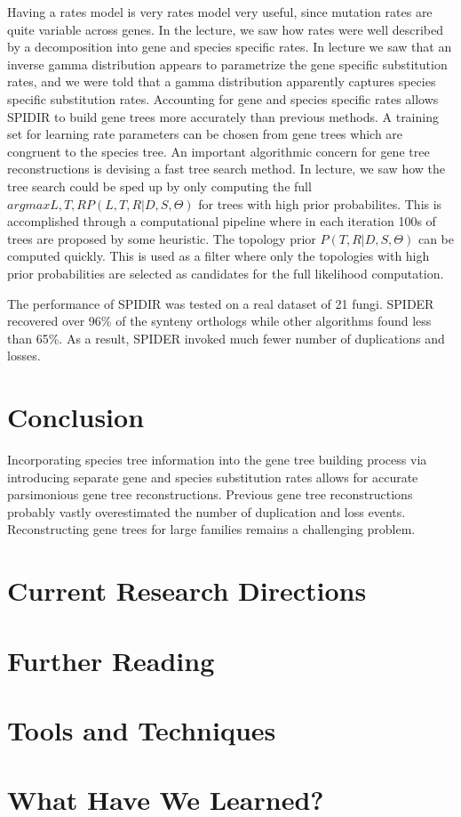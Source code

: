 Having a rates model is very rates model very useful, since mutation
rates are quite variable across genes. In the lecture, we saw how
rates were well described by a decomposition into gene and species
specific rates. In lecture we saw that an inverse gamma distribution
appears to parametrize the gene specific substitution rates, and we
were told that a gamma distribution apparently captures species
specific substitution rates. Accounting for gene and species specific
rates allows SPIDIR to build gene trees more accurately than previous
methods. A training set for learning rate parameters can be chosen
from gene trees which are congruent to the species tree. An important
algorithmic concern for gene tree reconstructions is devising a fast
tree search method. In lecture, we saw how the tree search could be
sped up by only computing the full $argmax L,T,R P(L,T,R|D,S,\Theta)$
for trees with high prior probabilites. This is accomplished through a
computational pipeline where in each iteration 100s of trees are
proposed by some heuristic. The topology prior $P(T,R|D,S,\Theta)$ can
be computed quickly. This is used as a filter where only the
topologies with high prior probabilities are selected as candidates
for the full likelihood computation.

\noindent The performance of SPIDIR was tested on a real dataset of 21
fungi. SPIDER recovered over 96\% of the synteny orthologs while other
algorithms found less than 65\%. As a result, SPIDER invoked much
fewer number of duplications and losses.

\section{Conclusion} 
Incorporating species tree information into the gene tree building
process via introducing separate gene and species substitution rates
allows for accurate parsimonious gene tree reconstructions. Previous
gene tree reconstructions probably vastly overestimated the number of
duplication and loss events. Reconstructing gene trees for large
families remains a challenging problem.

\section{Current Research Directions}
\section{Further Reading}
\section{Tools and Techniques} 
\section{What Have We Learned?}

\nocite{*}

 
